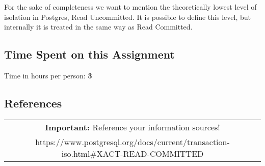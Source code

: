 \documentclass[11pt]{scrartcl}
\begin{document}
For the sake of completeness we want to mention the theoretically lowest level of isolation in Postgres, Read Uncommitted. It is possible to define this level, but internally it is treated in the same way as Read Committed.

\subsection*{Time Spent on this Assignment}

Time in hours per person: \textbf{3}

\subsection*{References}

\begin{table}[H]
  \centering
  \begin{tabular}{c}
    \hline
    \textbf{Important:} Reference your information sources! \tabularnewline
    https://www.postgresql.org/docs/current/transaction-iso.html\#XACT-READ-COMMITTED \tabularnewline
    \hline
  \end{tabular}
\end{table}
\end{document}
